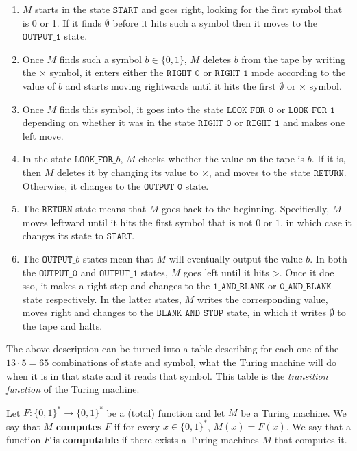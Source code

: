 \begin{example}
    \begin{enumerate}
        \item $M$ starts in the state $\texttt{START}$ and goes right, looking for the first symbol that is 0 or 1. If it finds $\emptyset$ before it hits such a symbol then it moves to the $\texttt{OUTPUT\_1}$ state. 
        \item Once $M$ finds such a symbol $b \in \{0,1\}$, $M$ deletes $b$ from the tape by writing the $\times$ symbol, it enters either the $\texttt{RIGHT\_0}$ or $\texttt{RIGHT\_1}$ mode according to the value of $b$ and starts moving rightwards until it hits the first $\emptyset$ or $\times$ symbol. 
        \item Once $M$ finds this symbol, it goes into the state $\texttt{LOOK\_FOR\_0}$ or $\texttt{LOOK\_FOR\_1}$ depending on whether it was in the state $\texttt{RIGHT\_0}$ or $\texttt{RIGHT\_1}$ and makes one left move. 
        \item In the state $\texttt{LOOK\_FOR\_}b$, $M$ checks whether the value on the tape is $b$. If it is, then $M$ deletes it by changing its value to $\times$, and moves to the state $\texttt{RETURN}$. Otherwise, it changes to the $\texttt{OUTPUT\_0}$ state. 
        \item The $\texttt{RETURN}$ state means that $M$ goes back to the beginning. Specifically, $M$ moves leftward until it hits the first symbol that is not $0$ or $1$, in which case it changes its state to $\texttt{START}$. 
        \item The $\texttt{OUTPUT\_}b$ states mean that $M$ will eventually output the value $b$. In both the $\texttt{OUTPUT\_0}$ and $\texttt{OUTPUT\_1}$ states, $M$ goes left until it hits $\triangleright$. Once it doe sso, it makes a right step and changes to the $\texttt{1\_AND\_BLANK}$ or $\texttt{0\_AND\_BLANK}$ state respectively. In the latter states, $M$ writes the corresponding value, moves right and changes to the $\texttt{BLANK\_AND\_STOP}$ state, in which it writes $\emptyset$ to the tape and halts. 
    \end{enumerate}
    The above description can be turned into a table describing for each one of the $13 \cdot 5 = 65$ combinations of state and symbol, what the Turing machine will do when it is in that state and it reads that symbol. This table is the \textit{transition function} of the Turing machine. 
  \end{example}

  \begin{definition}
    \label{def:computable-functions}
    Let $F: \{0,1\}^\ast \to \{0,1\}^\ast$ be a (total) function and let $M$ be a \hyperref[def:turing-machine]{Turing machine}. We say that $M$ \textbf{computes} $F$ if for every $x \in \{0,1\}^\ast$, $M(x) = F(x)$. We say that a function $F$ is \textbf{computable} if there exists a Turing machines $M$ that computes it. 
  \end{definition}


